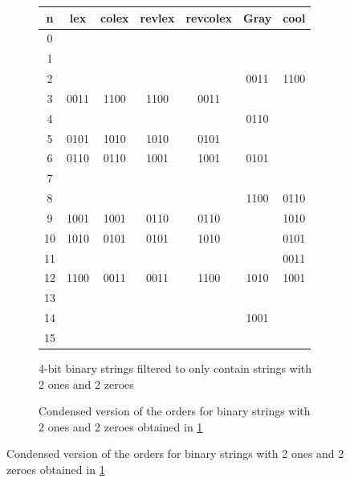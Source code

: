 \begin{figure}[]
     \begin{subfigure}[]{\textwidth}
         \begin{center}
         \caption{4-bit binary strings filtered to only contain strings with 2 ones and 2 zeroes}
             \begin{tabular}{ |c|c|c|c|c||c||c| } 
                 \hline
                 n &  lex  & colex & revlex & revcolex & Gray & cool\\
                 \hline
                 0 &      &      &      &      &       &      \\
                 1 &      &      &      &      &       &      \\
                 2 &      &      &      &      & 0011  & 1100 \\
                 3 & 0011 & 1100 & 1100 & 0011 &       &      \\
                 4 &      &      &      &      & 0110  &      \\
                 5 & 0101 & 1010 & 1010 & 0101 &       &      \\
                 6 & 0110 & 0110 & 1001 & 1001 & 0101  &      \\
                 7 &      &      &      &      &       &      \\
                 8 &      &      &      &      & 1100  & 0110 \\
                 9 & 1001 & 1001 & 0110 & 0110 &       & 1010 \\
                 10 & 1010 & 0101 & 0101 & 1010 &      & 0101 \\
                 11 &      &      &      &      &      & 0011 \\
                 12 & 1100 & 0011 & 0011 & 1100 & 1010 & 1001 \\
                 13 &      &      &      &      &      &      \\
                 14 &      &      &      &      & 1001 &      \\
                 15 &      &      &      &      &      &      \\
                 \hline
             \end{tabular}
         \end{center}
         \label{fig:bin4to2c2}
     \end{subfigure}
     \begin{subfigure}[]{\textwidth}
         \caption{Condensed version of the orders for binary strings with 2 ones and 2 zeroes obtained in \ref{fig:bin4to2c2}}

\end{subfigure}
\end{figure}
